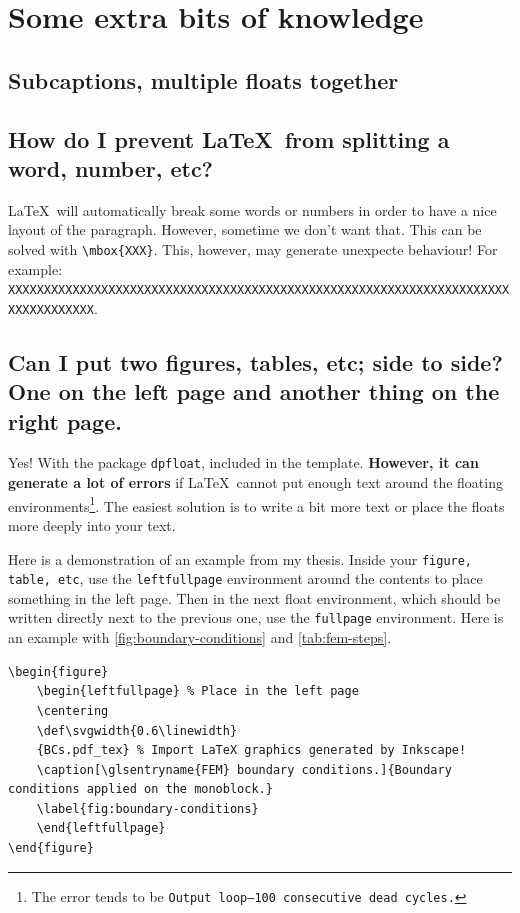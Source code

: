 \section{Some extra bits of knowledge}

\subsection{Subcaptions, multiple floats together} \label{sec:subcaption}


\subsection{How do I prevent \LaTeX\ from splitting a word, number, etc?}

\LaTeX\ will automatically break some words or numbers in order to have a nice layout of the paragraph. However, sometime we don't want that. This can be solved with \verb|\mbox{XXX}|. This, however, may generate unexpecte behaviour! For example: \mbox{\texttt{XXXXXXXXXXXXXXXXXXXXXXXXXXXXXXXXXXXXXXXXXXXXXXXXXXXXXXXXXXXXXXXXXXXXXXXXXXXXXXXXXX}}.

\subsection[Can I put two figures, tables, etc; side to side?]{Can I put two figures, tables, etc; side to side? One on the left page and another thing on the right page.}

Yes! With the package \verb|dpfloat|, included in the template. \textbf{However, it can generate a lot of errors} if \LaTeX\ cannot put enough text around the floating environments\footnote{The error tends to be \texttt{Output loop---100 consecutive dead cycles.}}. The easiest solution is to write a bit more text or place the floats more deeply into your text.

Here is a demonstration of an example from my thesis. Inside your \texttt{figure, table, etc}, use the \verb|leftfullpage| environment around the contents to place something in the left page. Then in the next float environment, which should be written directly next to the previous one, use the \verb|fullpage| environment. Here is an example with \cref{fig:boundary-conditions} and \cref{tab:fem-steps}.

\begin{lstlisting}[language={[LaTeX]TeX}]
\begin{figure}
	\begin{leftfullpage} % Place in the left page
	\centering
	\def\svgwidth{0.6\linewidth}
	{BCs.pdf_tex} % Import LaTeX graphics generated by Inkscape!
	\caption[\glsentryname{FEM} boundary conditions.]{Boundary conditions applied on the monoblock.}
	\label{fig:boundary-conditions}
	\end{leftfullpage}
\end{figure}
\end{lstlisting}


